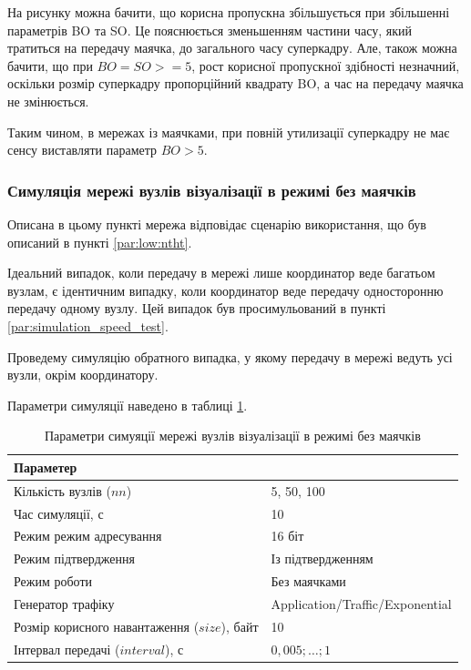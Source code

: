 \documentclass[a4paper,ukrainian,utf8,nocolumnsxix,floatsection,equationsection]{eskdtext}
\renewcommand\paragraph{\subsubsection}
\begin{document}
На рисунку можна бачити, що корисна пропускна збільшується при збільшенні параметрів BO та SO. Це пояснюється зменьшенням частини часу, який тратиться на передачу маячка, до загального часу суперкадру. Але, також можна бачити, що при $BO=SO>=5$, рост корисної пропускної здібності незначний, оскільки розмір суперкадру пропорційний квадрату BO, а час на передачу маячка не змінюється.

Таким чином, в мережах із маячками, при повній утилизації суперкадру не має сенсу виставляти параметр $BO>5$. 


\paragraph{Симуляція мережі вузлів візуалізації в режимі без маячків}
\label{par:simulation_backtraf_nobeac}

Описана в цьому пункті мережа відповідає сценарію використання, що був описаний в пункті \ref{par:low:ntht}.

Ідеальний випадок, коли передачу в мережі лише координатор веде багатьом вузлам, є ідентичним випадку, коли координатор веде передачу односторонню передачу одному вузлу. Цей випадок був просимульований в пункті \ref{par:simulation_speed_test}.

Проведему симуляцію обратного випадка, у якому передачу в мережі ведуть усі вузли, окрім координатору. 

Параметри симуляції наведено в таблиці \ref{tbl:simulation_backtraf_nobeac_nobrd}.


\begin{table}[htbp]
\caption{Параметри симуяції мережі вузлів візуалізації в режимі без маячків}
\centering
\begin{tabular}{|l|l|}
	\hline
	Параметер                                    &                                 \\ \hline
	Кількість вузлів ($nn$)                      & 5, 50, 100                      \\ \hline
	Час симуляції, с                             & 10                              \\ \hline
	Режим режим адресування                      & 16 біт                          \\ \hline
	Режим підтвердження                          & Із підтвердженням               \\ \hline
	Режим роботи                                 & Без маячками                    \\ \hline
	Генератор трафіку                            & Application/Traffic/Exponential \\ \hline
	Розмір корисного навантаження ($size$), байт & 10                              \\ \hline
	Інтервал передачі ($interval$), с            & $0,005;\dots;1$                \\ \hline
\end{tabular}
\label{tbl:simulation_backtraf_nobeac_nobrd}
\end{table}
\end{document}
